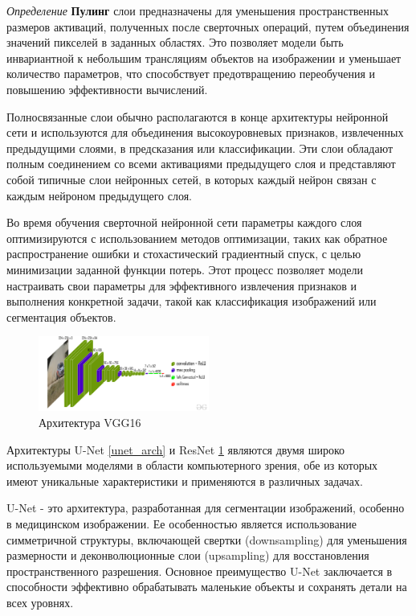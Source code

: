 \textit{Определение} \textbf{Пулинг} слои предназначены для уменьшения пространственных размеров активаций, полученных после сверточных операций, путем объединения значений пикселей в заданных областях. Это позволяет модели быть инвариантной к небольшим трансляциям объектов на изображении и уменьшает количество параметров, что способствует предотвращению переобучения и повышению эффективности вычислений.



Полносвязанные слои обычно располагаются в конце архитектуры нейронной сети и используются для объединения высокоуровневых признаков, извлеченных предыдущими слоями, в предсказания или классификации. Эти слои обладают полным соединением со всеми активациями предыдущего слоя и представляют собой типичные слои нейронных сетей, в которых каждый нейрон связан с каждым нейроном предыдущего слоя.

Во время обучения сверточной нейронной сети параметры каждого слоя оптимизируются с использованием методов оптимизации, таких как обратное распространение ошибки и стохастический градиентный спуск, с целью минимизации заданной функции потерь. Этот процесс позволяет модели настраивать свои параметры для эффективного извлечения признаков и выполнения конкретной задачи, такой как классификация изображений или сегментация объектов.


\begin{figure}[h]
    \centering
    \includegraphics[width=0.5\textwidth]{assets/ml/cv/vgg16.jpg}
    \caption{Архитектура VGG16 \cite{simonyan2014very}}
    \label{vgg_arch}
\end{figure}


Архитектуры U-Net \ref{unet_arch}  и ResNet \ref{vgg_arch} являются двумя широко используемыми моделями в области компьютерного зрения, обе из которых имеют уникальные характеристики и применяются в различных задачах.

U-Net - это архитектура, разработанная для сегментации изображений, особенно в медицинском изображении. Ее особенностью является использование симметричной структуры, включающей свертки (downsampling) для уменьшения размерности и деконволюционные слои (upsampling) для восстановления пространственного разрешения. Основное преимущество U-Net заключается в способности эффективно обрабатывать маленькие объекты и сохранять детали на всех уровнях.

